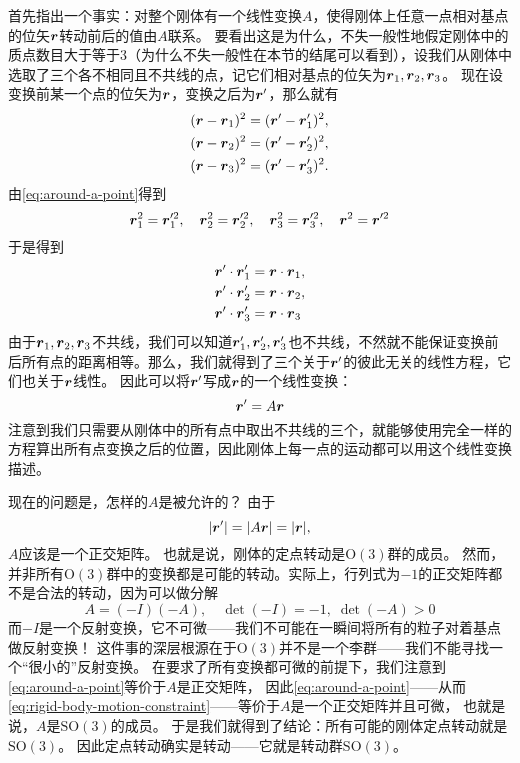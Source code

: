 \documentclass[UTF8, a4paper]{ctexart}
\newcommand*{\ogroup}[1]{\mathrm{O}(#1)}
\newcommand*{\sogroup}[1]{\mathrm{SO}(#1)}
\begin{document}
首先指出一个事实：对整个刚体有一个线性变换$A$，使得刚体上任意一点相对基点的位矢$\vb*{r}$转动前后的值由$A$联系。
要看出这是为什么，不失一般性地假定刚体中的质点数目大于等于3（为什么不失一般性在本节的结尾可以看到），设我们从刚体中选取了三个各不相同且不共线的点，记它们相对基点的位矢为$\vb*{r}_1, \vb*{r}_2, \vb*{r}_3$。
现在设变换前某一个点的位矢为$\vb*{r}$，变换之后为$\vb*{r}'$，那么就有
\[
    \begin{aligned}
        (\vb*{r} - \vb*{r}_1)^2 &= (\vb*{r}' - \vb*{r}_1')^2, \\
        (\vb*{r} - \vb*{r}_2)^2 &= (\vb*{r}' - \vb*{r}_2')^2, \\
        (\vb*{r} - \vb*{r}_3)^2 &= (\vb*{r}' - \vb*{r}_3')^2.
    \end{aligned}
\]
由\eqref{eq:around-a-point}得到
\[
    \vb*{r}_1^2 = \vb*{r}_1'^2, \quad \vb*{r}_2^2 = \vb*{r}_2'^2, \quad \vb*{r}_3^2 = \vb*{r}_3'^2, \quad \vb*{r}^2 = \vb*{r}'^2
\]
于是得到
\[
    \begin{aligned}
        \vb*{r}' \cdot \vb*{r}_1' &= \vb*{r} \cdot \vb*{r}_1, \\
        \vb*{r}' \cdot \vb*{r}_2' &= \vb*{r} \cdot \vb*{r}_2, \\
        \vb*{r}' \cdot \vb*{r}_3' &= \vb*{r} \cdot \vb*{r}_3
    \end{aligned} 
\]
由于$\vb*{r}_1, \vb*{r}_2, \vb*{r}_3$不共线，我们可以知道$\vb*{r}'_1, \vb*{r}'_2, \vb*{r}'_3$也不共线，不然就不能保证变换前后所有点的距离相等。那么，我们就得到了三个关于$\vb*{r}'$的彼此无关的线性方程，它们也关于$\vb*{r}$线性。
因此可以将$\vb*{r}'$写成$\vb*{r}$的一个线性变换：
\[
    \vb*{r}' = A \vb*{r}
\]
注意到我们只需要从刚体中的所有点中取出不共线的三个，就能够使用完全一样的方程算出所有点变换之后的位置，因此刚体上每一点的运动都可以用这个线性变换描述。

现在的问题是，怎样的$A$是被允许的？
由于
\[
    \abs{\vb*{r}'} = \abs{A \vb*{r}} = \abs{\vb*{r}},
\]
$A$应该是一个正交矩阵。
也就是说，刚体的定点转动是$\ogroup{3}$群的成员。
然而，并非所有$\ogroup{3}$群中的变换都是可能的转动。实际上，行列式为$-1$的正交矩阵都不是合法的转动，因为可以做分解
\[
    A = (-I) (-A), \quad \det (-I) = -1, \; \det (-A) > 0
\]
而$-I$是一个反射变换，它不可微——我们不可能在一瞬间将所有的粒子对着基点做反射变换！
这件事的深层根源在于$\ogroup{3}$并不是一个李群——我们不能寻找一个“很小的”反射变换。
在要求了所有变换都可微的前提下，我们注意到\eqref{eq:around-a-point}等价于$A$是正交矩阵，
因此\eqref{eq:around-a-point}——从而\eqref{eq:rigid-body-motion-constraint}——等价于$A$是一个正交矩阵并且可微，
也就是说，$A$是$\sogroup{3}$的成员。
于是我们就得到了结论：所有可能的刚体定点转动就是$\sogroup{3}$。
因此定点转动确实是转动——它就是转动群$\sogroup{3}$。
\end{document}
